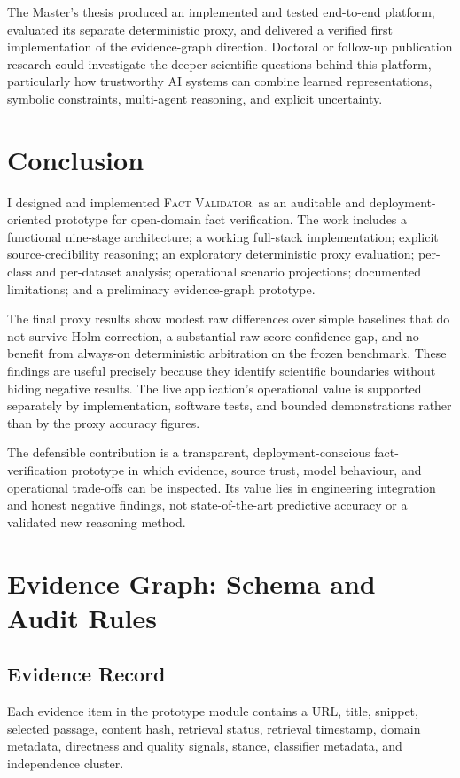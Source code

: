 \documentclass[12pt,a4paper,openany]{report}
\newcommand{\system}{\textsc{Fact Validator}}
\begin{document}
The Master's thesis produced an implemented and tested end-to-end platform, evaluated its separate deterministic proxy, and delivered a verified first implementation of the evidence-graph direction. Doctoral or follow-up publication research could investigate the deeper scientific questions behind this platform, particularly how trustworthy AI systems can combine learned representations, symbolic constraints, multi-agent reasoning, and explicit uncertainty.

\chapter{Conclusion}
I designed and implemented \system\ as an auditable and deployment-oriented prototype for open-domain fact verification. The work includes a functional nine-stage architecture; a working full-stack implementation; explicit source-credibility reasoning; an exploratory deterministic proxy evaluation; per-class and per-dataset analysis; operational scenario projections; documented limitations; and a preliminary evidence-graph prototype.

The final proxy results show modest raw differences over simple baselines that do not survive Holm correction, a substantial raw-score confidence gap, and no benefit from always-on deterministic arbitration on the frozen benchmark. These findings are useful precisely because they identify scientific boundaries without hiding negative results. The live application's operational value is supported separately by implementation, software tests, and bounded demonstrations rather than by the proxy accuracy figures.

The defensible contribution is a transparent, deployment-conscious
fact-verification prototype in which evidence, source trust, model behaviour,
and operational trade-offs can be inspected. Its value lies in engineering
integration and honest negative findings, not state-of-the-art predictive
accuracy or a validated new reasoning method.

\appendix
\chapter{Evidence Graph: Schema and Audit Rules}
\section{Evidence Record}
Each evidence item in the prototype module contains a URL, title, snippet, selected passage, content hash, retrieval status, retrieval timestamp, domain metadata, directness and quality signals, stance, classifier metadata, and independence cluster.
\end{document}
